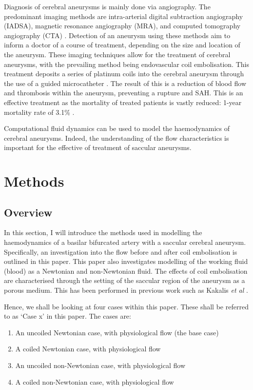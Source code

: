 \documentclass[journal,twoside,web]{ieeecolor}
\begin{document}
Diagnosis of cerebral aneurysms is mainly done via angiography. The predominant imaging methods are intra-arterial digital subtraction angiography (IADSA), magnetic resonance angiography (MRA), and computed tomography angiography (CTA) \cite{doi:10.1177/1358863X18754693}. Detection of an aneurysm using these methods aim to inform a doctor of a course of treatment, depending on the size and location of the aneurysm. These imaging techniques allow for the treatment of cerebral aneurysms, with the prevailing method being endovascular coil embolisation. This treatment deposits a series of platinum coils into the cerebral aneurysm through the use of a guided microcatheter \cite{Pouratian572}. The result of this is a reduction of blood flow and thrombosis within the aneurysm, preventing a rupture and SAH. This is an effective treatment as the mortality of treated patients is vastly reduced: 1-year mortality rate of 3.1\% \cite{1231234}.

Computational fluid dynamics can be used to model the haemodynamics of cerebral aneurysms. Indeed, the understanding of the flow characteristics is important for the effective of treatment of saccular aneurysms.
\section{Methods}
\subsection{Overview}
In this section, I will introduce the methods used in modelling the haemodynamics of a basilar bifurcated artery with a saccular cerebral aneurysm. Specifically, an investigation into the flow before and after coil embolisation is outlined in this paper. This paper also investigates modelling of the working fluid (blood) as a Newtonian and non-Newtonian fluid. The effects of coil embolisation are characterised through the setting of the saccular region of the aneurysm as a porous medium. This has been performed in previous work such as Kakalis \textit{et al} \cite{30180980813}.

Hence, we shall be looking at four cases within this paper. These shall be referred to as `Case x' in this paper. The cases are:
\begin{enumerate}
    \item An uncoiled Newtonian case, with physiological flow (the base case)
    \item A coiled Newtonian case, with physiological flow
    \item An uncoiled non-Newtonian case, with physiological flow
    \item A coiled non-Newtonian case, with physiological flow
\end{enumerate}
\end{document}
